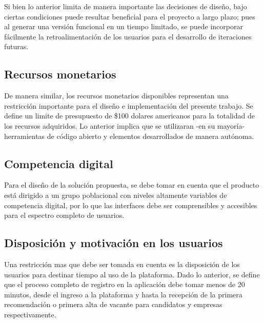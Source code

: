 Si bien lo anterior limita de manera importante las decisiones de diseño, bajo ciertas condiciones puede resultar beneficial para el proyecto a largo plazo; pues al generar una versión funcional en un tiempo limitado, se puede incorporar fácilmente la retroalimentación de los usuarios para el desarrollo de iteraciones futuras.

\subsection{Recursos monetarios}
De manera similar, los recursos monetarios disponibles representan una restricción importante para el diseño e implementación del presente trabajo. Se define un limite de presupuesto de \$100 dolares americanos para la totalidad de los recursos adquiridos. Lo anterior implica que se utilizaran -en su mayoría- herramientas de código abierto y elementos desarrollados de manera autónoma. 

\subsection{Competencia digital}
Para el diseño de la solución propuesta, se debe tomar en cuenta que el producto está dirigido a un grupo poblacional con niveles altamente variables de competencia digital, por lo que las interfaces debe ser comprensibles y accesibles para el espectro completo de usuarios. 

\subsection{Disposición y motivación en los usuarios}
Una restricción mas que debe ser tomada en cuenta es la disposición de los usuarios para destinar tiempo al uso de la plataforma. Dado lo anterior, se define que el proceso completo de registro en la aplicación debe tomar menos de 20 minutos, desde el ingreso a la plataforma y hasta la recepción de la primera recomendación o primera alta de vacante para candidatos y empresas respectivamente. 


